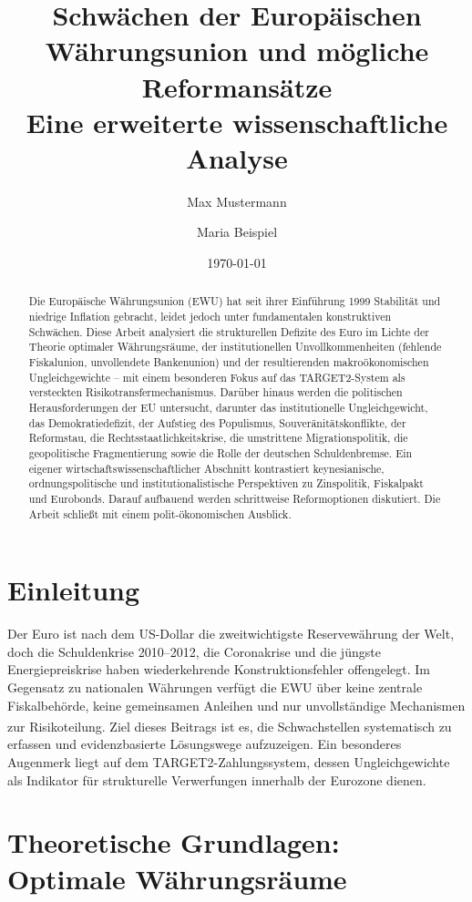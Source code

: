 \documentclass[12pt,a4paper]{article}
\title{Schwächen der Europäischen Währungsunion und mögliche Reformansätze\\ \large Eine erweiterte wissenschaftliche Analyse}
\author{Max Mustermann \and Maria Beispiel}
\date{\today}
\newcommand{\footcite}[1]{\textsuperscript{\cite{#1}}}
\begin{document}
	
	\maketitle
	
	\begin{abstract}
		Die Europäische Währungsunion (EWU) hat seit ihrer Einführung 1999 Stabilität und niedrige Inflation gebracht, leidet jedoch unter fundamentalen konstruktiven Schwächen. Diese Arbeit analysiert die strukturellen Defizite des Euro im Lichte der Theorie optimaler Währungsräume, der institutionellen Unvollkommenheiten (fehlende Fiskalunion, unvollendete Bankenunion) und der resultierenden makroökonomischen Ungleichgewichte – mit einem besonderen Fokus auf das TARGET2-System als versteckten Risikotransfermechanismus. Darüber hinaus werden die politischen Herausforderungen der EU untersucht, darunter das institutionelle Ungleichgewicht, das Demokratiedefizit, der Aufstieg des Populismus, Souveränitätskonflikte, der Reformstau, die Rechtsstaatlichkeitskrise, die umstrittene Migrationspolitik, die geopolitische Fragmentierung sowie die Rolle der deutschen Schuldenbremse. Ein eigener wirtschaftswissenschaftlicher Abschnitt kontrastiert keynesianische, ordnungspolitische und institutionalistische Perspektiven zu Zinspolitik, Fiskalpakt und Eurobonds. Darauf aufbauend werden schrittweise Reformoptionen diskutiert. Die Arbeit schließt mit einem polit-ökonomischen Ausblick.
	\end{abstract}
	
	\section{Einleitung}
	
	Der Euro ist nach dem US-Dollar die zweitwichtigste Reservewährung der Welt, doch die Schuldenkrise 2010–2012, die Coronakrise und die jüngste Energiepreiskrise haben wiederkehrende Konstruktionsfehler offengelegt. Im Gegensatz zu nationalen Währungen verfügt die EWU über keine zentrale Fiskalbehörde, keine gemeinsamen Anleihen und nur unvollständige Mechanismen zur Risikoteilung.\footcite{DeGrauwe2020} Ziel dieses Beitrags ist es, die Schwachstellen systematisch zu erfassen und evidenzbasierte Lösungswege aufzuzeigen. Ein besonderes Augenmerk liegt auf dem TARGET2-Zahlungssystem, dessen Ungleichgewichte als Indikator für strukturelle Verwerfungen innerhalb der Eurozone dienen.
	
	\section{Theoretische Grundlagen: Optimale Währungsräume}
	
\end{document}
